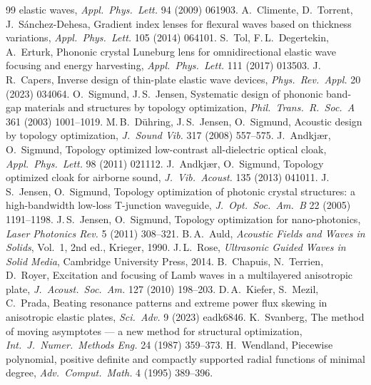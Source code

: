 \begin{thebibliography}{99}
elastic waves, \emph{Appl.\ Phys.\ Lett.} 94 (2009) 061903.
 A.\ Climente, D.\ Torrent, J.\ S\'anchez-Dehesa, Gradient index lenses for
flexural waves based on thickness variations, \emph{Appl.\ Phys.\ Lett.} 105 (2014) 064101.
 S.\ Tol, F.\,L.\ Degertekin, A.\ Erturk, Phononic crystal Luneburg lens for
omnidirectional elastic wave focusing and energy harvesting, \emph{Appl.\ Phys.\ Lett.} 111
(2017) 013503.
 J.\,R.\ Capers, Inverse design of thin-plate elastic wave devices,
\emph{Phys.\ Rev.\ Appl.} 20 (2023) 034064.
 O.\ Sigmund, J.\,S.\ Jensen, Systematic design of phononic band-gap
materials and structures by topology optimization, \emph{Phil.\ Trans.\ R.\ Soc.\ A} 361
(2003) 1001--1019.
 M.\,B.\ D\"uhring, J.\,S.\ Jensen, O.\ Sigmund, Acoustic design by topology
optimization, \emph{J.\ Sound Vib.} 317 (2008) 557--575.
 J.\ Andkj{\ae}r, O.\ Sigmund, Topology optimized low-contrast
all-dielectric optical cloak, \emph{Appl.\ Phys.\ Lett.} 98 (2011) 021112.
 J.\ Andkj{\ae}r, O.\ Sigmund, Topology optimized cloak for airborne sound,
\emph{J.\ Vib.\ Acoust.} 135 (2013) 041011.
 J.\,S.\ Jensen, O.\ Sigmund, Topology optimization of photonic crystal
structures: a high-bandwidth low-loss T-junction waveguide, \emph{J.\ Opt.\ Soc.\ Am.\ B} 22
(2005) 1191--1198.
 J.\,S.\ Jensen, O.\ Sigmund, Topology optimization for nano-photonics,
\emph{Laser Photonics Rev.} 5 (2011) 308--321.
 B.\,A.\ Auld, \emph{Acoustic Fields and Waves in Solids}, Vol.~1, 2nd ed.,
Krieger, 1990.
 J.\,L.\ Rose, \emph{Ultrasonic Guided Waves in Solid Media}, Cambridge
University Press, 2014.
 B.\ Chapuis, N.\ Terrien, D.\ Royer, Excitation and focusing of Lamb waves
in a multilayered anisotropic plate, \emph{J.\ Acoust.\ Soc.\ Am.} 127 (2010) 198--203.
 D.\,A.\ Kiefer, S.\ Mezil, C.\ Prada, Beating resonance patterns and
extreme power flux skewing in anisotropic elastic plates, \emph{Sci.\ Adv.} 9 (2023)
eadk6846.
 K.\ Svanberg, The method of moving asymptotes --- a new method for
structural optimization, \emph{Int.\ J.\ Numer.\ Methods Eng.} 24 (1987) 359--373.
 H.\ Wendland, Piecewise polynomial, positive definite and compactly
supported radial functions of minimal degree, \emph{Adv.\ Comput.\ Math.} 4 (1995) 389--396.
\end{thebibliography}
